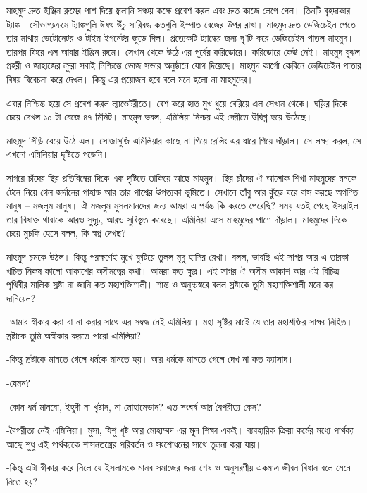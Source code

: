 \documentclass[
]{book}
\begin{document}
মাহমুদ দ্রুত ইঞ্জিন রুমের পাশ দিয়ে জ্বালানি সঞ্চয় কক্ষে প্রবেশ করল এবং দ্রুত কাজে লেগে গেল। তিনটি বৃহদাকার ট্যাঙ্ক। সৌভাগ্যক্রমে ট্যাঙ্কগুলি ঈষৎ উঁচু সারিবদ্ধ কতগুলি ইস্পাত বেজের উপর রাখা। মাহমুদ দ্রুত ডেজিচেইন পেতে তার মাথায় ডেটোনেটর ও টাইম ইগনেটর জুড়ে দিল। প্রত্যেকটি ট্যাঙ্কের জন্য দু'টি করে ডেজিচেইন পাতল মাহমুদ। তারপর ফিরে এল আবার ইঞ্জিন রুমে। সেখান থেকে উঠে এর পূর্বের করিডোরে। করিডোরে কেউ নেই। মাহমুদ বুঝল প্রহরী ও জাহাজের ক্রুরা সবাই নিশ্চিন্তে ভোজ সভার অনুষ্ঠানে যোগ দিয়েছে। মাহমুদ কার্গো কেবিনে ডেজিচেইন পাতার বিষয় বিবেচনা করে দেখল। কিন্তু এর প্রয়োজন হবে বলে মনে হলো না মাহমুদের।

এবার নিশ্চিন্ত হয়ে সে প্রবেশ করল ল্যাভেটরীতে। বেশ করে হাত মুখ ধুয়ে বেরিয়ে এল সেখান থেকে। ঘড়ির দিকে চেয়ে দেখল ১০ টা বেজে ৪৭ মিনিট। মাহমুদ ভবল, এমিলিয়া নিশ্চয় এই দেরীতে উদ্বিগ্ন হয়ে উঠেছে।

মাহমুদ সিঁড়ি বেয়ে উঠে এল। সোজাসুজি এমিলিয়ার কাছে না গিয়ে রেলিং এর ধারে গিয়ে দাঁড়াল। সে লক্ষ্য করল, সে এখনো এমিলিয়ার দৃষ্টিতে পড়েনি।

সাগরে চাঁদের স্থির প্রতিবিম্বের দিকে এক দৃষ্টিতে তাকিয়ে আছে মাহমুদ। স্থির চাঁদের ঐ আলোক শিখা মাহমুদের মনকে টেনে নিয়ে গেল জর্দানের পাহাড় আর তার পাশ্বের উপত্যকা ভূমিতে। সেখানে তাঁবু আর কুঁড়ে ঘরে বাস করছে অগণিত মানুষ -- মজলুম মানুষ। ঐ মজলুম মুসলমানদের জন্য আমরা এ পর্যন্ত কি করতে পেরেছি? সময় যতই গেছে ইসরাইল তার বিষাক্ত থাবাকে আরও সুদৃঢ়, আরও সুবিস্তৃত করেছে। এমিলিয়া এসে মাহমুদের পাশে দাঁড়াল। মাহমুদের দিকে চেয়ে মুচকি হেসে বলল, কি স্বপ্ন দেখছ?

মাহমুদ চমকে উঠল। কিন্তু পরক্ষণেই মুখে ফুটিয়ে তুলল মৃদু হাসির রেখা। বলল, ভাবছি এই সাগর আর এ তারকা খচিত নিকষ কালো আকাশের অসীমত্বের কথা। আমরা কত ক্ষুদ্র। এই সাগর ঐ অসীম আকাশ আর এই বিচিত্র পৃথিবীর মালিক স্রষ্টা না জানি কত মহাশক্তিশালী। শান্ত ও অনুচ্চস্বরে বলল স্রষ্টাকে তুমি মহাশক্তিশালী মনে কর দানিয়েল?

-আমার স্বীকার করা বা না করার সাথে এর সম্বন্ধ নেই এমিলিয়া। মহা সৃষ্টির মাইে যে তার মহাশক্তির সাক্ষ্য নিহিত। স্রষ্টাকে তুমি অস্বীকার করতে পারো এমিলিয়া?

-কিন্তু স্রষ্টাকে মানতে গেলে ধর্মকে মানতে হয়। আর ধর্মকে মানতে গেলে দেখ না কত ফ্যাসাদ।

-যেমন?

-কোন ধর্ম মানবো, ইহুদী না খৃষ্টান, না মোহামেডান? এত সংঘর্ষ আর বৈপরীত্য কেন?

-বৈপরীত্য নেই এমিলিয়া। মুসা, যিশু খৃষ্ট আর মোহাম্মদ এর মূল শিক্ষা একই। ব্যবহারিক ক্রিয়া কর্মের মধ্যে পার্থক্য আছে শুধু এই পার্থক্যকে শাসনতন্ত্রের পরিবর্তন ও সংশোধনের সাথে তুলনা করা যায়।

-কিন্তু এটা স্বীকার করে নিলে যে ইসলামকে মানব সমাজের জন্য শেষ ও অনুসরণীয় একমাত্র জীবন বিধান বলে মেনে নিতে হয়?
\end{document}
